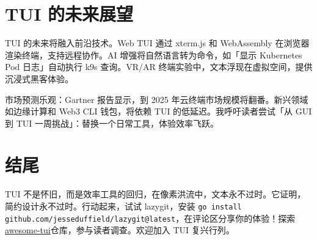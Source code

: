 \chapter{TUI 的未来展望}
TUI 的未来将融入前沿技术。Web TUI 通过 xterm.js 和 WebAssembly 在浏览器渲染终端，支持远程协作。AI 增强将自然语言转为命令，如「显示 Kubernetes Pod 日志」自动执行 k9s 查询。VR/AR 终端实验中，文本浮现在虚拟空间，提供沉浸式黑客体验。\par
市场预测乐观：Gartner 报告显示，到 2025 年云终端市场规模将翻番。新兴领域如边缘计算和 Web3 CLI 钱包，将依赖 TUI 的低延迟。我呼吁读者尝试「从 GUI 到 TUI 一周挑战」：替换一个日常工具，体验效率飞跃。\par
\chapter{结尾}
TUI 不是怀旧，而是效率工具的回归，在像素洪流中，文本永不过时。它证明，简约设计永不过时。行动起来，试试 lazygit，安装 \texttt{go install github.com/jesseduffield/lazygit@latest}，在评论区分享你的体验！探索\href{https://github.com/rothgar/awesome-tui}{awesome-tui}仓库，参与读者调查。欢迎加入 TUI 复兴行列。\par
